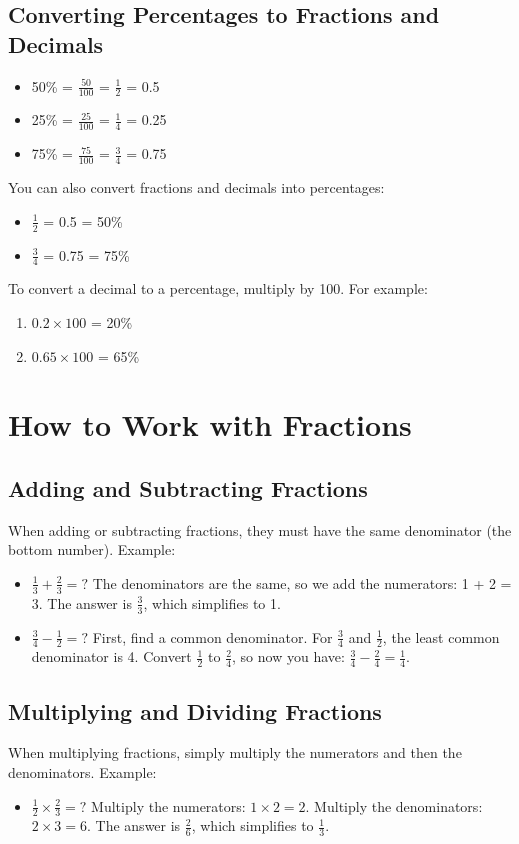\subsection{Converting Percentages to Fractions and Decimals}
\begin{itemize}
    \item 50\% = $\frac{50}{100}$ = $\frac{1}{2}$ = 0.5
    \item 25\% = $\frac{25}{100}$ = $\frac{1}{4}$ = 0.25
    \item 75\% = $\frac{75}{100}$ = $\frac{3}{4}$ = 0.75
\end{itemize}

You can also convert fractions and decimals into percentages:
\begin{itemize}
    \item $\frac{1}{2}$ = 0.5 = 50\%
    \item $\frac{3}{4}$ = 0.75 = 75\%
\end{itemize}

To convert a decimal to a percentage, multiply by 100. For example:
\begin{enumerate}
    \item $0.2 \times 100$ = 20\%
    \item $0.65 \times 100$ = 65\% 
\end{enumerate}

\section{How to Work with Fractions}
\subsection{Adding and Subtracting Fractions}
When adding or subtracting fractions, they must have the same denominator (the bottom number). Example:
\begin{itemize}
    \item $\frac{1}{3} + \frac{2}{3} = ?$ The denominators are the same, so we add the numerators: 1 + 2 = 3. The answer is $\frac{3}{3}$, which simplifies to 1.
    \item $\frac{3}{4} - \frac{1}{2} = ?$ First, find a common denominator. For $\frac{3}{4}$ and $\frac{1}{2}$, the least common denominator is 4. Convert $\frac{1}{2}$ to $\frac{2}{4}$, so now you have: $\frac{3}{4} - \frac{2}{4} = \frac{1}{4}$.
\end{itemize}

\subsection{Multiplying and Dividing Fractions}
When multiplying fractions, simply multiply the numerators and then the denominators. Example:
\begin{itemize}
    \item $\frac{1}{2} \times \frac{2}{3} = ?$ Multiply the numerators: $1 \times 2 = 2$. Multiply the denominators: $2 \times 3 = 6$. The answer is $\frac{2}{6}$, which simplifies to $\frac{1}{3}$.
\end{itemize}

